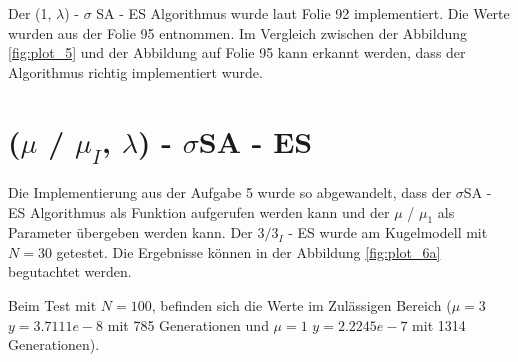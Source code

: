 Der (1, $\lambda$) - $\sigma$ SA - ES Algorithmus wurde laut Folie 92 implementiert. Die Werte wurden aus der Folie 95 entnommen. Im Vergleich zwischen der Abbildung \ref{fig:plot_5} und der Abbildung auf Folie 95 kann erkannt werden, dass der Algorithmus richtig implementiert wurde.


\chapter{($\mu$ / $\mu_I$, $\lambda$) - $\sigma$SA - ES}

Die Implementierung aus der Aufgabe 5 wurde so abgewandelt, dass der $\sigma$SA - ES Algorithmus als Funktion aufgerufen werden kann und der $\mu$ / $\mu_1$ als Parameter übergeben werden kann. Der $3/3_I$ - ES wurde am Kugelmodell mit $N = 30$ getestet. Die Ergebnisse können in der Abbildung \ref{fig:plot_6a} begutachtet werden.


Beim Test mit $N = 100$, befinden sich die Werte im Zulässigen Bereich ($ \mu=3$ $y = 3.7111e-8$ mit 785 Generationen und $\mu=1$ $y=2.2245e-7$ mit 1314 Generationen).


